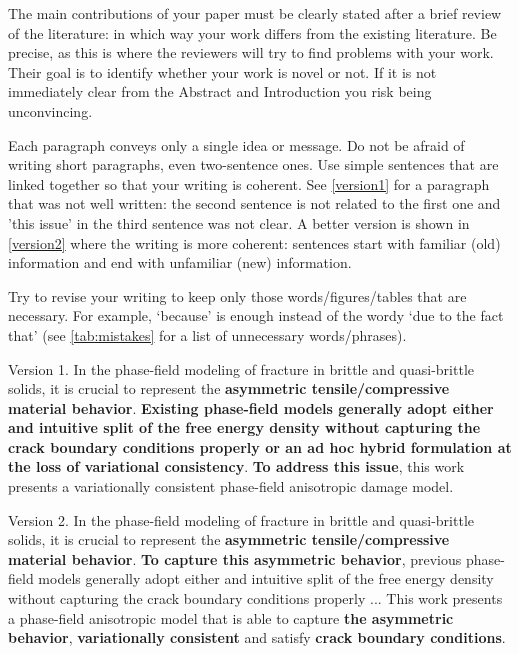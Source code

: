 \documentclass[authoryear,3p,times,preprint,review,fleqn]{elsarticle}
\numberwithin{equation}{section}
\theoremstyle{remark}
\begin{document}
The main contributions of your paper must be clearly stated after a brief review of the literature: in which way your work differs from the existing literature. Be precise, as this is where the reviewers will try to find problems with your work. Their goal is to identify whether your work is novel or not. If it is not immediately clear from the Abstract and Introduction you risk being unconvincing. 

Each paragraph conveys only a single idea or message. Do not be afraid of writing short paragraphs, even two-sentence ones. 
Use simple sentences that are linked together so that your writing is coherent. 
See \cref{version1} for a paragraph that was not well written: the second sentence is not related to the first one and 'this issue' in the third sentence was not clear. A better version is shown in \cref{version2} where the writing is more coherent: sentences start with familiar (old) information and end with unfamiliar (new) information.

Try to revise your writing to keep only those words/figures/tables that are necessary. For example, `because' is enough instead of the wordy `due to the fact that' (see \cref{tab:mistakes} for a list of unnecessary words/phrases).\\

\begin{MyBox}[width=0.48\textwidth,nobeforeafter,label={version1}]
{Version 1.}
{
In the phase-field modeling of fracture in brittle and quasi-brittle solids, it is crucial to represent the \textbf{asymmetric tensile/compressive material behavior}. \textbf{Existing phase-field models generally adopt either and intuitive split of the free energy density without capturing the crack boundary conditions properly or an ad hoc hybrid formulation at the loss of variational consistency}. \textbf{To address this issue}, this work presents a variationally consistent phase-field anisotropic damage model.}
\end{MyBox}\hfill
\begin{MyBox}[width=0.48\textwidth,nobeforeafter,label={version2}]
{Version 2.}
{
In the phase-field modeling of fracture in brittle and quasi-brittle solids, it is crucial to represent the \textbf{asymmetric tensile/compressive material behavior}. \textbf{To capture this asymmetric behavior}, previous phase-field models  generally adopt either and intuitive split of the free energy density without capturing the crack boundary conditions properly ... This work presents a phase-field anisotropic model that is able to capture \textbf{the asymmetric behavior}, \textbf{variationally consistent} and satisfy \textbf{crack boundary conditions}.}
\end{MyBox}
\end{document}
